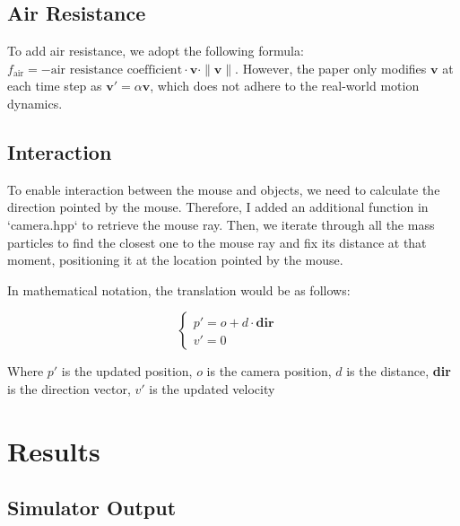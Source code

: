 \documentclass[acmtog]{acmart}
\begin{document}
\subsection{Air Resistance}

To add air resistance, we adopt the following formula: $f_{\text{air}} = -\text{air resistance coefficient} \cdot \mathbf{v} \cdot \|\mathbf{v}\|$. However, the paper only modifies $\mathbf{v}$ at each time step as $\mathbf{v'} = \alpha \mathbf{v}$, which does not adhere to the real-world motion dynamics.

\subsection{Interaction}
To enable interaction between the mouse and objects, we need to calculate the direction pointed by the mouse. Therefore, I added an additional function in `camera.hpp` to retrieve the mouse ray. Then, we iterate through all the mass particles to find the closest one to the mouse ray and fix its distance at that moment, positioning it at the location pointed by the mouse.

In mathematical notation, the translation would be as follows:

\[
\left\{
\begin{array}{ll}
p' = o + d \cdot \textbf{dir} & \\
v' = 0 &
\end{array}\right.
\]

Where \(p'\) is the updated position, \(o\) is the camera position, \(d\) is the distance, \textbf{dir} is the direction vector, \(v'\) is the updated velocity

\section{Results}

\subsection{Simulator Output}
\end{document}
